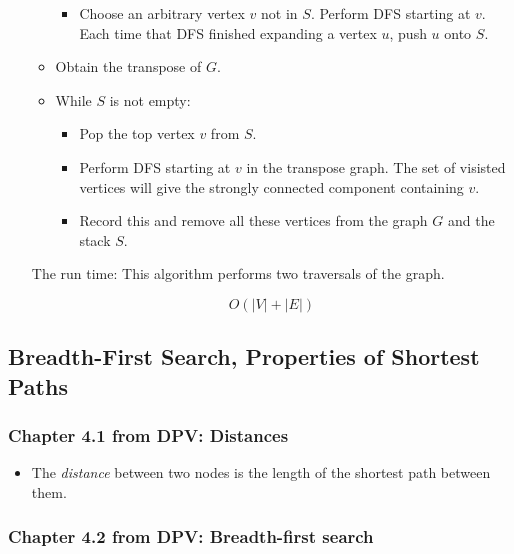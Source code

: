 \documentclass[a4paper,11pt]{article}
\begin{document}
\begin{enumerate}
\begin{itemize}
    \begin{itemize}
    \itemsep1pt\parskip0pt
    \item
      Choose an arbitrary vertex $v$ not in $S$. Perform DFS starting at
      $v$. Each time that DFS finished expanding a vertex $u$, push $u$
      onto $S$.
    \end{itemize}
  \item
    Obtain the transpose of $G$.
  \item
    While $S$ is not empty:

    \begin{itemize}
    \itemsep1pt\parskip0pt
    \item
      Pop the top vertex $v$ from $S$.
    \item
      Perform DFS starting at $v$ in the transpose graph. The set of
      visisted vertices will give the strongly connected component
      containing $v$.
    \item
      Record this and remove all these vertices from the graph $G$ and
      the stack $S$.
    \end{itemize}
  \end{itemize}

  The run time: This algorithm performs two traversals of the graph.

  \[O(|V| + |E|)\]
\end{enumerate}

\subsection{Breadth-First Search, Properties of Shortest
Paths}\label{breadth-first-search-properties-of-shortest-paths}

\subsubsection{Chapter 4.1 from DPV:
Distances}\label{chapter-4.1-from-dpv-distances}

\begin{itemize}
\itemsep1pt\parskip0pt
\item
  The \emph{distance} between two nodes is the length of the shortest
  path between them.
\end{itemize}

\subsubsection{Chapter 4.2 from DPV: Breadth-first
search}\label{chapter-4.2-from-dpv-breadth-first-search}
\end{document}
